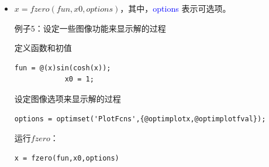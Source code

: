 \documentclass[cn,10pt,math=newtx,citestyle=gb7714-2015,bibstyle=gb7714-2015]{elegantbook}
\begin{document}
{{\begin{itemize}
		例子2：区间内的根——求解[0,1]上的余弦函数的根。
		
		\begin{lstlisting}[frame=shadowbox]
			fun = @cos; % 函数名
			x0 = [1 2]; % 初始区间
			x = fzero(fun,x0)
		\end{lstlisting}
		
		$x=1.5708$
		
		注意：$cos(1)$和$cos(2)$的符号不同。
		
		例子3：自定义函数求根
		
		求解函数$f(x)=x^3-2x-5$的根。
		
		首先，我们要写一个自定义函数的m文件，命名为f.m
		
		\begin{lstlisting}[frame=shadowbox]
			function y = f(x)
			y = x.^3-2*x-5;
		\end{lstlisting}
		
		将上述f.m文件保存到当前Matlab路径中。然后用$fzero$命令求解2 附近的根。
		
		\begin{lstlisting}[frame=shadowbox]
			fun = @f; % function
			x0 = 2; % initial point
			z = fzero(fun,x0)
		\end{lstlisting}
		
		$x=2.0946$
		
		例子4：带有参数的函数求根
		\begin{lstlisting}[frame=shadowbox]
			myfun = @(x,c) cos(c*x);  % parameterized function
			c = 2;                    % parameter
			fun = @(x) myfun(x,c);    % function of x alone
			x = fzero(fun,0.1)
		\end{lstlisting}
		
		$x=0.7854$
		
		\item $x=fzero(fun,x0,options)$，其中，\textcolor{blue}{options} 表示可选项。
		
		例子5：设定一些图像功能来显示解的过程
		
		定义函数和初值
		
		\begin{lstlisting}[frame=shadowbox]
			fun = @(x)sin(cosh(x));
			x0 = 1;
		\end{lstlisting}
		
		设定图像选项来显示解的过程
		\begin{lstlisting}[frame=shadowbox]
			options = optimset('PlotFcns',{@optimplotx,@optimplotfval});
		\end{lstlisting}
		
		运行$fzero$：
		\begin{lstlisting}[frame=shadowbox]
			x = fzero(fun,x0,options)
		\end{lstlisting}
		

\end{itemize}}}
\end{document}
